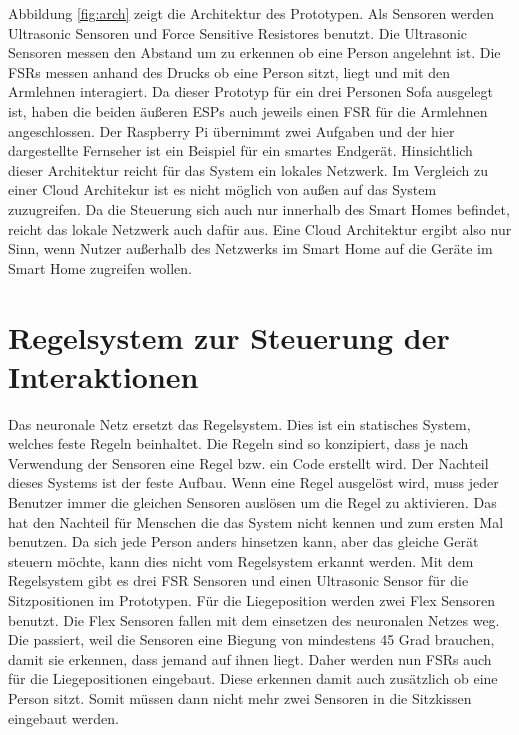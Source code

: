 Abbildung \ref{fig:arch} zeigt die Architektur des Prototypen. Als Sensoren werden Ultrasonic Sensoren und Force Sensitive Resistores benutzt. Die Ultrasonic Sensoren messen den Abstand um zu erkennen ob eine Person angelehnt ist. Die FSRs messen anhand des Drucks ob eine Person sitzt, liegt und mit den Armlehnen interagiert. Da dieser Prototyp für ein drei Personen Sofa ausgelegt ist, haben die beiden äußeren ESPs auch jeweils einen FSR für die Armlehnen angeschlossen. Der Raspberry Pi übernimmt zwei Aufgaben und der hier dargestellte Fernseher ist ein Beispiel für ein smartes Endgerät.
\newline
Hinsichtlich dieser Architektur reicht für das System ein lokales Netzwerk. Im Vergleich zu einer Cloud Architekur ist es nicht möglich von außen auf das System zuzugreifen. Da die Steuerung sich auch nur innerhalb des Smart Homes befindet, reicht das lokale Netzwerk auch dafür aus. Eine Cloud Architektur ergibt also nur Sinn, wenn Nutzer außerhalb des Netzwerks im Smart Home auf die Geräte im Smart Home zugreifen wollen.

\section{Regelsystem zur Steuerung der Interaktionen} 
Das neuronale Netz ersetzt das Regelsystem. Dies ist ein statisches System, welches feste Regeln beinhaltet. Die Regeln sind so konzipiert, dass je nach Verwendung der Sensoren eine Regel bzw. ein Code erstellt wird. Der Nachteil dieses Systems ist der feste Aufbau. Wenn eine Regel ausgelöst wird, muss jeder Benutzer immer die gleichen Sensoren auslösen um die Regel zu aktivieren. Das hat den Nachteil für Menschen die das System nicht kennen und zum ersten Mal benutzen. Da sich jede Person anders hinsetzen kann, aber das gleiche Gerät steuern möchte, kann dies nicht vom Regelsystem erkannt werden.
\newline
Mit dem Regelsystem gibt es drei FSR Sensoren und einen Ultrasonic Sensor für die Sitzpositionen im Prototypen. Für die Liegeposition werden zwei Flex Sensoren benutzt. Die Flex Sensoren fallen mit dem einsetzen des neuronalen Netzes weg. Die passiert, weil die Sensoren eine Biegung von mindestens 45 Grad brauchen, damit sie erkennen, dass jemand auf ihnen liegt. Daher werden nun FSRs auch für die Liegepositionen eingebaut. Diese erkennen damit auch zusätzlich ob eine Person sitzt. Somit müssen dann nicht mehr zwei Sensoren in die Sitzkissen eingebaut werden. 

